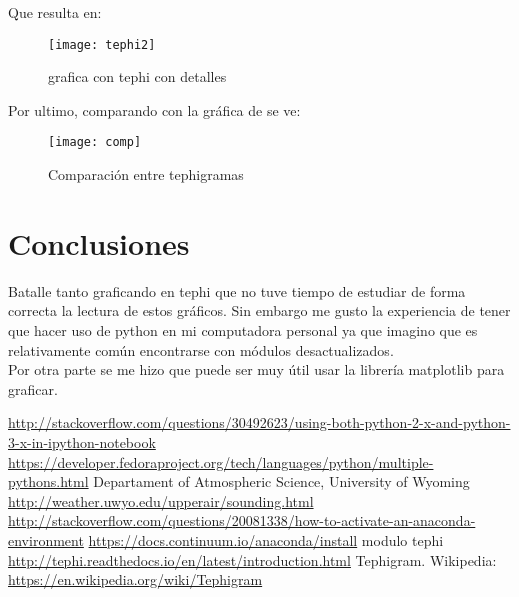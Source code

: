 \documentclass[12pt,letterpaper]{article}
\begin{document}
Que resulta en:
\begin{figure}[H]
\begin{center}
\texttt{[image: tephi2]}
\end{center}
\caption{grafica con tephi con detalles}
\end{figure}



Por ultimo, comparando con la gráfica de \cite{c} se ve:
\begin{figure}[H]
\begin{center}
\texttt{[image: comp]}
\end{center}
\caption{Comparación entre tephigramas}
\end{figure}

\section{Conclusiones} 

Batalle tanto graficando en tephi que no tuve tiempo de estudiar de forma correcta la lectura de estos gráficos. Sin embargo me gusto la experiencia de tener que hacer uso de python en mi computadora personal ya que imagino que es relativamente común encontrarse con módulos desactualizados.\\
Por otra parte se me hizo que puede ser muy útil usar la librería matplotlib para graficar.\\

\begin{thebibliography}{2}

 \url{http://stackoverflow.com/questions/30492623/using-both-python-2-x-and-python-3-x-in-ipython-notebook}
 \url{https://developer.fedoraproject.org/tech/languages/python/multiple-pythons.html}
 Departament of Atmospheric Science, University of Wyoming \url{http://weather.uwyo.edu/upperair/sounding.html}
 \url{http://stackoverflow.com/questions/20081338/how-to-activate-an-anaconda-environment}
 \url{https://docs.continuum.io/anaconda/install}
 modulo tephi \url{http://tephi.readthedocs.io/en/latest/introduction.html}
 Tephigram. Wikipedia: \url{https://en.wikipedia.org/wiki/Tephigram}

\end{thebibliography}
\end{document}
